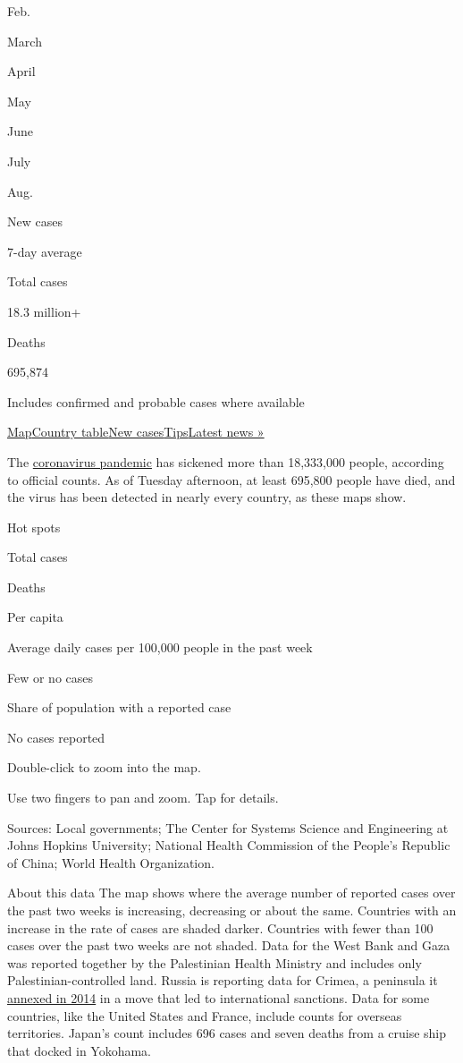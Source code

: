 Feb.

March

April

May

June

July

Aug.

New cases

7-day average

Total cases

18.3 million+

Deaths

695,874

Includes confirmed and probable cases where available

\protect\hyperlink{map}{Map}\protect\hyperlink{countries}{Country
table}\protect\hyperlink{cases}{New
cases}\protect\hyperlink{tips}{Tips}\href{https://www.nytimes3xbfgragh.onion/2020/08/04/world/coronavirus-covid-19.html}{Latest
news »}

The
\href{https://www.nytimes3xbfgragh.onion/article/prepare-for-coronavirus.html}{coronavirus
pandemic} has sickened more than 18,333,000 people, according to
official counts. As of Tuesday afternoon, at least 695,800 people have
died, and the virus has been detected in nearly every country, as these
maps show.

Hot spots

Total cases

Deaths

Per capita

Average daily cases per 100,000 people in the past week

Few or no cases

Share of population with a reported case

No cases reported

Double-click to zoom into the map.

Use two fingers to pan and zoom. Tap for details.

Sources: Local governments; The Center for Systems Science and
Engineering at Johns Hopkins University; National Health Commission of
the People's Republic of China; World Health Organization.

About this data The map shows where the average number of reported cases
over the past two weeks is increasing, decreasing or about the same.
Countries with an increase in the rate of cases are shaded darker.
Countries with fewer than 100 cases over the past two weeks are not
shaded. Data for the West Bank and Gaza was reported together by the
Palestinian Health Ministry and includes only Palestinian-controlled
land. Russia is reporting data for Crimea, a peninsula it
\href{https://www.nytimes3xbfgragh.onion/2014/03/19/world/europe/ukraine.html}{annexed
in 2014} in a move that led to international sanctions. Data for some
countries, like the United States and France, include counts for
overseas territories. Japan's count includes 696 cases and seven deaths
from a cruise ship that docked in Yokohama.

